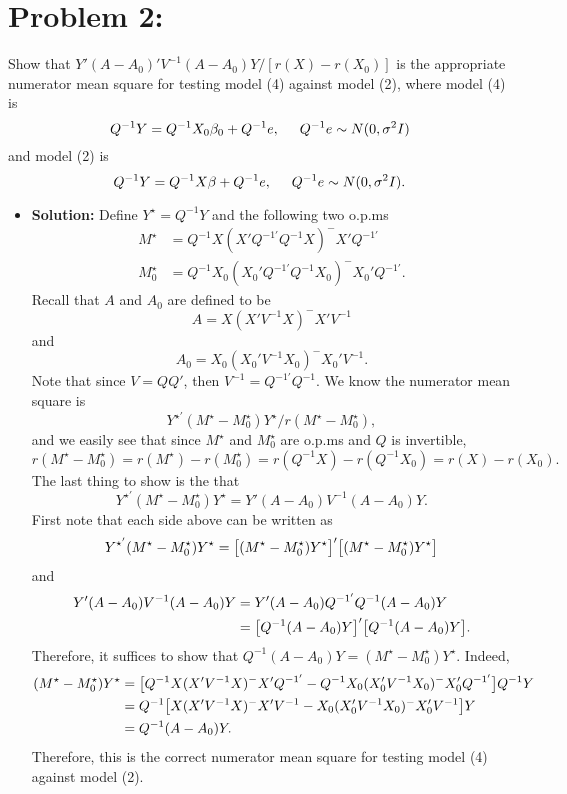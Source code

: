 \documentclass[11pt]{article}
\begin{document}
\section*{Problem 2:}  Show that $Y'(A - A_0)'V^{-1}(A - A_0)Y / [r(X) - r(X_0)]$ is the appropriate numerator mean square for testing model (4) against model (2), where model (4) is
\[
Q^{-1}Y = Q^{-1}X_0\beta_0 + Q^{-1}e, \hspace{5mm}Q^{-1}e \sim N(0,\sigma^2I)
\]
and model (2) is
\[
Q^{-1}Y  = Q^{-1}X\beta + Q^{-1}e, \hspace{5mm} Q^{-1}e \sim N(0, \sigma^2I).
\]
\begin{itemize}
\item[] {\bf Solution:}  Define $Y^\star = Q^{-1}Y$ and the following two o.p.ms
\begin{align*}
M^\star &= Q^{-1}X(X'Q^{-1'}Q^{-1}X)^-X'Q^{-1'} \\
M_0^\star &= Q^{-1}X_0(X_0'Q^{-1'}Q^{-1}X_0)^-X_0'Q^{-1'}.
\end{align*}
Recall that $A$ and $A_0$ are defined to be
\[
A = X(X'V^{-1}X)^-X'V^{-1}
\]
and
\[
A_0 = X_0(X_0'V^{-1}X_0)^-X_0'V^{-1}.
\]
Note that since $V = QQ'$, then $V^{-1} = Q^{-1'}Q^{-1}$.
We know the numerator mean square is
\[
Y^{\star'}(M^\star - M_{0}^\star)Y^\star / r(M^\star - M_0^\star),
\]
and we easily see that since $M^\star$ and $M^\star_0$ are o.p.ms and $Q$ is invertible,
\[
r(M^\star - M_0^\star) = r(M^\star) - r(M_0^\star) = r(Q^{-1}X) - r(Q^{-1}X_0) = r(X) - r(X_0).
\]
The last thing to show is the that
\[
Y^{\star'}(M^\star - M_0^\star)Y^\star = Y'(A-A_0)V^{-1}(A-A_0)Y.
\]
First note that each side above can be written as
\[
Y^{\star'}(M^\star - M_0^\star)Y^\star = \big{[} (M^\star - M_0^\star)Y^{\star} \big{]}'\big{[} (M^\star - M_0^\star)Y^{\star} \big{]}
\]
and
\begin{align*}
Y'(A-A_0)V^{-1}(A-A_0)Y &= Y'(A-A_0)Q^{-1'}Q^{-1}(A-A_0)Y \\
&= \big{[} Q^{-1}(A-A_0)Y \big{]}' \big{[} Q^{-1}(A-A_0)Y \big{]}.
\end{align*}
Therefore, it suffices to show that $Q^{-1}(A-A_0)Y = (M^\star - M_0^\star)Y^\star$.  Indeed,
\begin{align*}
(M^\star - M_0^\star)Y^\star &= \big{[} Q^{-1}X(X'V^{-1}X)^-X'Q^{-1'} - Q^{-1}X_0(X_0'V^{-1}X_0)^-X_0'Q^{-1'} \big{]}Q^{-1}Y \\
&= Q^{-1}\big{[} X(X'V^{-1}X)^-X'V^{-1} - X_0(X_0'V^{-1}X_0)^-X_0'V^{-1} \big{]}Y \\
&= Q^{-1}(A - A_0)Y.
\end{align*}
Therefore, this is the correct numerator mean square for testing model (4) against model (2).
\end{itemize}
\end{document}
